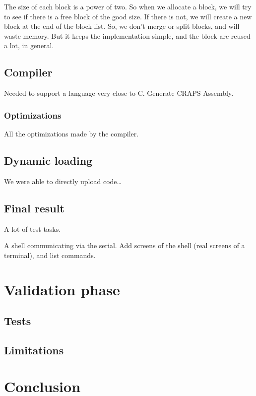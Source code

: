 \documentclass[openany, a4paper]{book}
\begin{document}
      The size of each block is a power of two. So when we allocate a block, we
      will try to see if there is a free block of the good size. If there is
      not, we will create a new block at the end of the block list.
      So, we don't merge or split blocks, and will waste memory. But it keeps
      the implementation simple, and the block are reused a lot, in general.

    \section{Compiler}
      Needed to support a language very close to C. Generate CRAPS Assembly.

      \subsection{Optimizations}
        All the optimizations made by the compiler.

    \section{Dynamic loading}
      We were able to directly upload code\dots

    \section{Final result}
      A lot of test tasks.

      A shell communicating via the serial.
      Add screens of the shell (real screens of a terminal), and list commands.

  \chapter{Validation phase}

    \section{Tests}

    \section{Limitations}

  \chapter{Conclusion}
\end{document}
